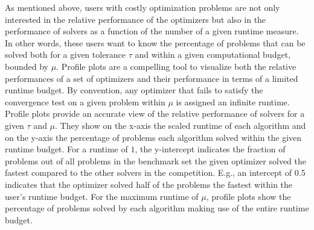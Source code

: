 \noindent As mentioned above, users with costly optimization problems are not only interested in the relative performance of the optimizers but also in the performance of solvers as a function of the number of a given runtime measure. In other words, these users want to know the percentage of problems that can be solved both for a given tolerance $\tau$ and within a given computational budget, bounded by $\mu$. Profile plots are a compelling tool to visualize both the relative performances of a set of optimizers and their performance in terms of a limited runtime budget. By convention, any optimizer that fails to satisfy the convergence test on a given problem within $\mu$ is assigned an infinite runtime.
Profile plots provide an accurate view of the relative performance of solvers for a given $\tau$ and $\mu$. They show on the x-axis the scaled runtime of each algorithm and on the y-axis the percentage of problems each algorithm solved within the given runtime budget. For a runtime of $1$, the y-intercept indicates the fraction of problems out of all problems in the benchmark set the given optimizer solved the fastest compared to the other solvers in the competition.
E.g., an intercept of 0.5 indicates that the optimizer solved half of the problems the fastest within the user's runtime budget. For the maximum runtime of $\mu$, profile plots show the percentage of problems solved by each algorithm making use of the entire runtime budget.






